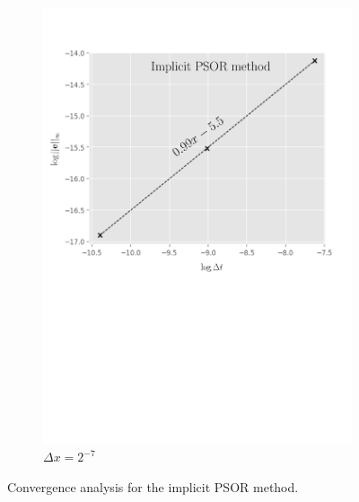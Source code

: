 \begin{figure}[H]
\begin{subfigure}{0.4\textwidth}
    \includegraphics[width=\textwidth]{chapters/chapter5/ConvergenceTimeImplicitLCP.pdf}
    \caption{$\Delta{t}=2^{-15},2^{-17},\dots,2^{-21}$}
    \caption*{$\Delta{x}=2^{-7}$}
    \label{fig:lcp:numericalresults:convergence_time_implicit}
  \end{subfigure}
  \caption{Convergence analysis for the implicit PSOR method.}
  \label{fig:lcp:numericalresults:implicit_convergence_analysis}
\end{figure}


